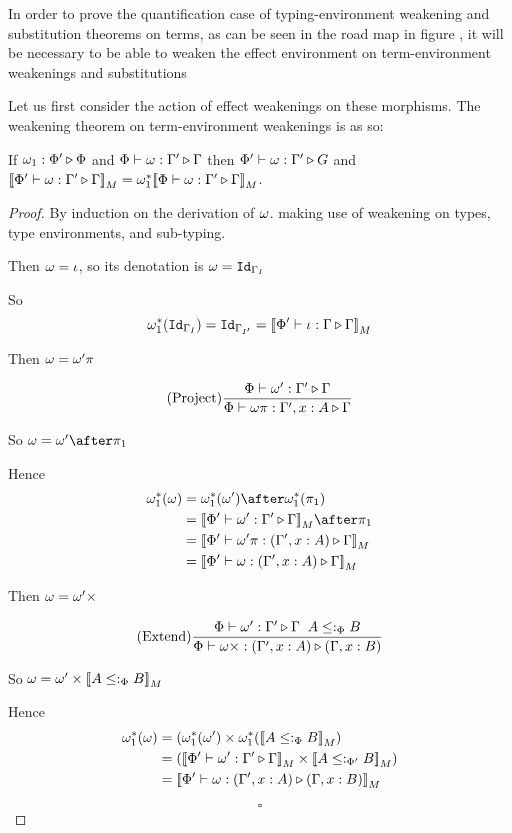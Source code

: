 \documentclass{Report}
\begin{document}
In order to prove the quantification case of typing-environment weakening and substitution theorems on terms, as can be seen in the road map in figure , it will be necessary to be able to weaken the effect environment on term-environment weakenings and substitutions

Let us first consider the action of effect weakenings on these morphisms. The weakening theorem on term-environment weakenings is as so:


\begin{theorem}
    If $\omega_1 : \Phi' \triangleright \Phi$ and $\Phi\vdash \omega : \Gamma' \triangleright \Gamma$ then $\Phi'\vdash \omega : \Gamma' \triangleright G$ and ${\bf [\![}\Phi'\vdash \omega : \Gamma' \triangleright \Gamma{\bf ]\!]}_M = \omega_1^*{\bf [\![}\Phi\vdash \omega : \Gamma' \triangleright \Gamma{\bf ]\!]}_M$.
\end{theorem}

\begin{proof}
    By induction on the derivation of $\omega$. making use of weakening on types, type environments, and sub-typing.

    Then $\omega = \iota$, so its denotation is $\omega = \texttt{Id}_{\Gamma_I}$
    
    So
    \begin{equation}
      \omega_1^*(\texttt{Id}_{\Gamma_I}) = \texttt{Id}_{\Gamma_{I'}} = {\bf [\![}\Phi'\vdash \iota : \Gamma \triangleright \Gamma{\bf ]\!]}_M  
    \end{equation}
    
    Then $\omega = \omega'\pi$
    
    \begin{equation}
        (\text{Project}) \frac{\Phi\vdash \omega' : \Gamma' \triangleright \Gamma}{\Phi\vdash \omega\pi : \Gamma',x:A \triangleright \Gamma}
    \end{equation}
    
    So $\w = \w'\after\p$
    
    Hence
    \begin{align}
        \w_1\star(\w) &= \w_1\star(\w')\after\w_1\star(\p)\\
        & = \deno{\ewrel{\P'}{\w'}{\G'}{\G}}\after\p\\
        & = \deno{\ewrel{\P'}{\w'\pi}{(\G',x:A)}{\G}}\\
        & = \deno{\ewrel{\P'}{\w}{(\G', x:A)}{\G}}
    \end{align}
    
    Then $\omega = \omega'\times$
    
    \begin{equation}
        (\text{Extend}) \frac{\Phi\vdash \omega' : \Gamma' \triangleright \Gamma\;\; A\leq:_\Phi B}{\Phi\vdash \omega\times : (\Gamma',x:A) \triangleright (\Gamma, x:B)}
    \end{equation}
    
    So $\omega = \omega'\times{\bf [\![}A\leq:_\Phi B{\bf ]\!]}_M$
    
    Hence
    \begin{align}
        \w_1\star(\w) &=(\w_1\star(\w')\times\w_1\star(\deno{A\subtypep B})\\
        & = (\deno{\ewrel{\P'}{\w'}{\G'}{\G}}\times\deno{A\subtypepp B})\\
        & = \deno{\ewrel{\P'}{\w}{(\G',x:A)}{(\G,x:B)}}
    \end{align}

    $$\square$$
\end{proof}
\end{document}

